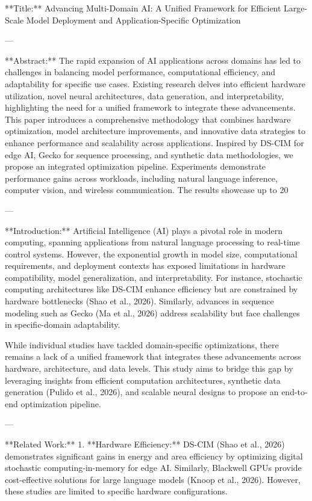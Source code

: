 **Title:**  
Advancing Multi-Domain AI: A Unified Framework for Efficient Large-Scale Model Deployment and Application-Specific Optimization  

---

**Abstract:**  
The rapid expansion of AI applications across domains has led to challenges in balancing model performance, computational efficiency, and adaptability for specific use cases. Existing research delves into efficient hardware utilization, novel neural architectures, data generation, and interpretability, highlighting the need for a unified framework to integrate these advancements. This paper introduces a comprehensive methodology that combines hardware optimization, model architecture improvements, and innovative data strategies to enhance performance and scalability across applications. Inspired by DS-CIM for edge AI, Gecko for sequence processing, and synthetic data methodologies, we propose an integrated optimization pipeline. Experiments demonstrate performance gains across workloads, including natural language inference, computer vision, and wireless communication. The results showcase up to 20%

---

**Introduction:**  
Artificial Intelligence (AI) plays a pivotal role in modern computing, spanning applications from natural language processing to real-time control systems. However, the exponential growth in model size, computational requirements, and deployment contexts has exposed limitations in hardware compatibility, model generalization, and interpretability. For instance, stochastic computing architectures like DS-CIM enhance efficiency but are constrained by hardware bottlenecks (Shao et al., 2026). Similarly, advances in sequence modeling such as Gecko (Ma et al., 2026) address scalability but face challenges in specific-domain adaptability.  

While individual studies have tackled domain-specific optimizations, there remains a lack of a unified framework that integrates these advancements across hardware, architecture, and data levels. This study aims to bridge this gap by leveraging insights from efficient computation architectures, synthetic data generation (Pulido et al., 2026), and scalable neural designs to propose an end-to-end optimization pipeline.  

---

**Related Work:**  
1. **Hardware Efficiency:**  
    DS-CIM (Shao et al., 2026) demonstrates significant gains in energy and area efficiency by optimizing digital stochastic computing-in-memory for edge AI. Similarly, Blackwell GPUs provide cost-effective solutions for large language models (Knoop et al., 2026). However, these studies are limited to specific hardware configurations.  


